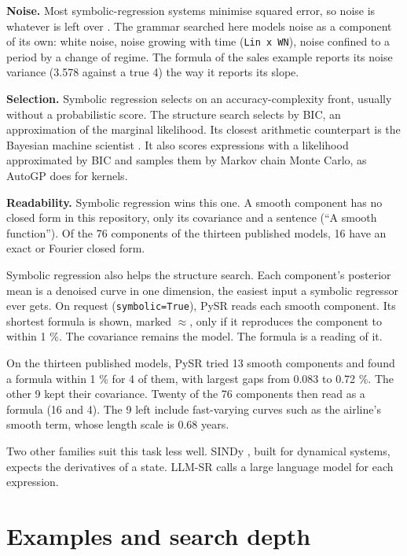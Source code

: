 \documentclass[
]{article}
\begin{document}
\textbf{Noise.} Most symbolic-regression systems minimise squared error,
so noise is whatever is left over
\autocite{cranmer2023pysr,lacava2021srbench}. The grammar searched here
models noise as a component of its own: white noise, noise growing with
time (\texttt{Lin\ x\ WN}), noise confined to a period by a change of
regime. The formula of the sales example reports its noise variance
(3.578 against a true 4) the way it reports its slope.

\textbf{Selection.} Symbolic regression selects on an
accuracy-complexity front, usually without a probabilistic score. The
structure search selects by BIC, an approximation of the marginal
likelihood. Its closest arithmetic counterpart is the Bayesian machine
scientist \autocite{guimera2020bms}. It also scores expressions with a
likelihood approximated by BIC and samples them by Markov chain Monte
Carlo, as AutoGP does for kernels.

\textbf{Readability.} Symbolic regression wins this one. A smooth
component has no closed form in this repository, only its covariance and
a sentence (``A smooth function''). Of the 76 components of the thirteen
published models, 16 have an exact or Fourier closed form.

Symbolic regression also helps the structure search. Each component's
posterior mean is a denoised curve in one dimension, the easiest input a
symbolic regressor ever gets. On request (\texttt{symbolic=True}), PySR
reads each smooth component. Its shortest formula is shown, marked
\(\approx\), only if it reproduces the component to within 1 \%. The
covariance remains the model. The formula is a reading of it.

On the thirteen published models, PySR tried 13 smooth components and
found a formula within 1 \% for 4 of them, with largest gaps from 0.083
to 0.72 \%. The other 9 kept their covariance. Twenty of the 76
components then read as a formula (16 and 4). The 9 left include
fast-varying curves such as the airline's smooth term, whose length
scale is 0.68 years.

Two other families suit this task less well. SINDy
\autocite{brunton2016sindy}, built for dynamical systems, expects the
derivatives of a state. LLM-SR \autocite{shojaee2025llmsr} calls a large
language model for each expression.

\section{Examples and search depth}\label{examples-and-search-depth}
\end{document}
